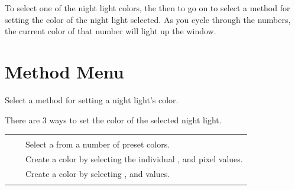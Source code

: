 To select one of the night light colors,  the  then 
to go on to select a method for setting the color of the night light selected.
As you cycle through the numbers, the current color of that number will light up
the  window.



\section{Method Menu} 

Select a method for setting a night light's color.

\par\medskip

There are \num{3} ways to set the color of the selected night light.

\begin{table}[H]
\centering
\begin{tabu} { X[1,c,m] | X[1,c,m] | X[3,l,m] }
  \thrule
   &  &  \\ \mrule
   &  & Select a  from a number of preset colors. \\ 
   &  & Create a color by selecting the
    individual ,  and  pixel values. \\ 
   &  & Create a color by selecting
    ,  and  values. \\
  \bhrule
\end{tabu}
\end{table}

